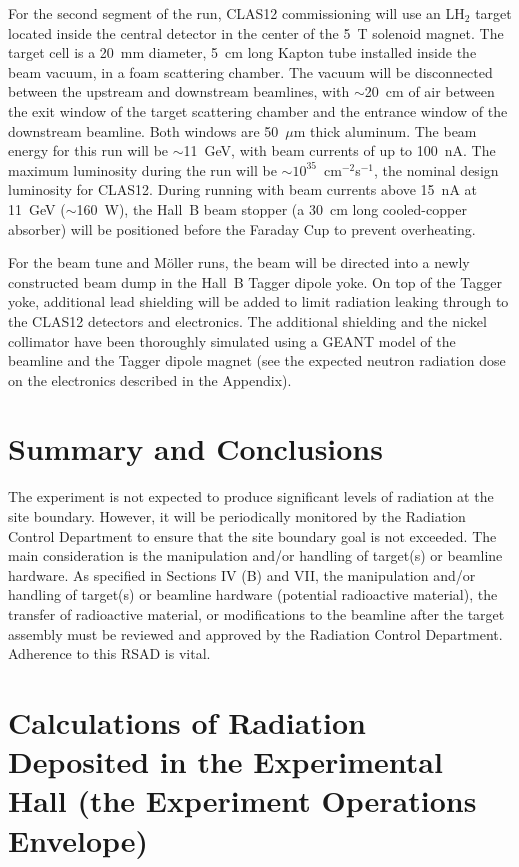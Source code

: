\documentclass [12pt]{article}
\begin{document}
For the second segment of the run, CLAS12 commissioning will use an LH$_2$ target located inside 
the central detector in the center of the 5~T solenoid magnet. The target cell is a 20~mm diameter, 
5~cm long Kapton tube installed inside the beam vacuum, in a foam scattering chamber. The vacuum 
will be disconnected between the upstream and downstream beamlines, with $\sim$20~cm of air between 
the exit window of the target scattering chamber and the entrance window of the downstream beamline. 
Both windows are 50~$\mu$m thick aluminum. The beam energy for this run will be $\sim$11~GeV, with 
beam currents of up to 100~nA. The maximum luminosity during the run will be 
$\sim 10^{35}$~cm$^{-2}$s$^{-1}$, the nominal design luminosity for CLAS12. During running with beam 
currents above 15~nA at 11~GeV ($\sim$160~W), the Hall~B beam stopper (a 30~cm long cooled-copper 
absorber) will be positioned before the Faraday Cup to prevent overheating. 

For the beam tune and M{\"o}ller runs, the beam will be directed into a newly constructed beam dump in 
the Hall~B Tagger dipole yoke. On top of the Tagger yoke, additional lead shielding will be added 
to limit radiation leaking through to the CLAS12 detectors and electronics. The additional shielding 
and the nickel collimator have been thoroughly simulated using a GEANT model of the beamline and the 
Tagger dipole magnet (see the expected neutron radiation dose on the electronics described in the 
Appendix).

\section{Summary and Conclusions}
\indent

The experiment is not expected to produce significant levels of radiation at the site boundary. 
However, it will be periodically monitored by the Radiation Control Department to ensure that the 
site boundary goal is not exceeded. The main consideration is the manipulation and/or handling of 
target(s) or beamline hardware. As specified in Sections IV (B) and VII, the manipulation and/or 
handling of target(s) or beamline hardware (potential radioactive material), the transfer of 
radioactive material, or modifications to the beamline after the target assembly must be reviewed 
and approved by the Radiation Control Department. Adherence to this RSAD is vital.


\section{Calculations of Radiation Deposited in the Experimental Hall
(the Experiment Operations Envelope)} 
\indent
\end{document}
